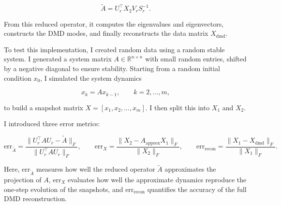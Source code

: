 \documentclass{article}
\begin{document}
\[
\tilde{A} = U_r^\top X_2 V_r S_r^{-1}.
\]  

From this reduced operator, it computes the eigenvalues and eigenvectors, constructs the DMD modes, and finally reconstructs the data matrix \(X_{\text{dmd}}\).  

\bigskip
To test this implementation, I created random data using a random stable system. 
I generated a system matrix \(A \in \mathbb{R}^{n \times n}\) with small random entries, shifted by a negative diagonal to ensure stability. 
Starting from a random initial condition \(x_0\), I simulated the system dynamics  

\[
x_{k} = A x_{k-1}, \qquad k=2,\dots,m,
\]  

to build a snapshot matrix \(X = [x_1, x_2, \dots, x_m]\). 
I then split this into \(X_1\) and \(X_2\).  

\bigskip

I introduced three error metrics:  

\[
\text{err}_{\tilde{A}} = \frac{\|U_r^\top A U_r - \tilde{A}\|_F}{\|U_r^\top A U_r\|_F}, \qquad
\text{err}_{X} = \frac{\|X_2 - A_{\text{approx}} X_1\|_F}{\|X_2\|_F}, \qquad
\text{err}_{\text{recon}} = \frac{\|X_1 - X_{\text{dmd}}\|_F}{\|X_1\|_F}.
\]  

Here, 
\(\text{err}_{\tilde{A}}\) measures how well the reduced operator \(\tilde{A}\) approximates the projection of \(A\), 
\(\text{err}_{X}\) evaluates how well the approximate dynamics reproduce the one-step evolution of the snapshots, 
and \(\text{err}_{\text{recon}}\) quantifies the accuracy of the full DMD reconstruction.  


\vspace{1cm}
\end{document}
